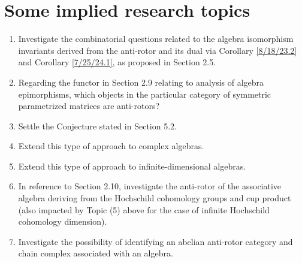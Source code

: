 \documentclass{amsart}
\numberwithin{equation}{section}
\theoremstyle{definition}
\numberwithin{theorem}{section}
\begin{document}
\section{Some implied research topics} 
\begin{enumerate} \item Investigate the combinatorial questions related to the algebra isomorphism invariants derived from the anti-rotor and its dual via Corollary \ref{8/18/23.2} and Corollary \ref{7/25/24.1}, as proposed in Section 2.5.  \item Regarding the functor in Section 2.9 relating to analysis of algebra epimorphisms, which objects in the particular category of symmetric parametrized matrices are anti-rotors? \item Settle the Conjecture stated in Section 5.2. \item Extend this type of approach to complex algebras. \item Extend this type of approach to infinite-dimensional algebras. \item In reference to Section 2.10, investigate the anti-rotor of the associative algebra deriving from the Hochschild cohomology groups and cup product (also impacted by Topic (5) above for the case of infinite Hochschild cohomology dimension).  \item Investigate the possibility of identifying an abelian anti-rotor category and chain complex associated with an algebra.    \end{enumerate}
  
\vspace{.75cm}
\end{document}
